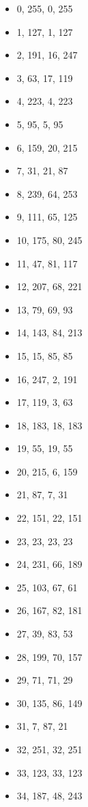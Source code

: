 \documentclass[12pt, fleqn]{report}                             %
\theoremstyle{break}                                            %
\begin{document}
      \begin{multicols}{3}

      \begin{itemize}
        \item 0, 255, 0, 255
        \item 1, 127, 1, 127
        \item 2, 191, 16, 247
        \item 3, 63, 17, 119
        \item 4, 223, 4, 223
        \item 5, 95, 5, 95
        \item 6, 159, 20, 215
        \item 7, 31, 21, 87
        \item 8, 239, 64, 253
        \item 9, 111, 65, 125
        \item 10, 175, 80, 245
        \item 11, 47, 81, 117
        \item 12, 207, 68, 221
        \item 13, 79, 69, 93
        \item 14, 143, 84, 213
        \item 15, 15, 85, 85
        \item 16, 247, 2, 191
        \item 17, 119, 3, 63
        \item 18, 183, 18, 183
        \item 19, 55, 19, 55
        \item 20, 215, 6, 159
        \item 21, 87, 7, 31
        \item 22, 151, 22, 151
        \item 23, 23, 23, 23
        \item 24, 231, 66, 189
        \item 25, 103, 67, 61
        \item 26, 167, 82, 181
        \item 27, 39, 83, 53
        \item 28, 199, 70, 157
        \item 29, 71, 71, 29
        \item 30, 135, 86, 149
        \item 31, 7, 87, 21
        \item 32, 251, 32, 251
        \item 33, 123, 33, 123
        \item 34, 187, 48, 243

\end{itemize}
\end{multicols}
\end{document}
